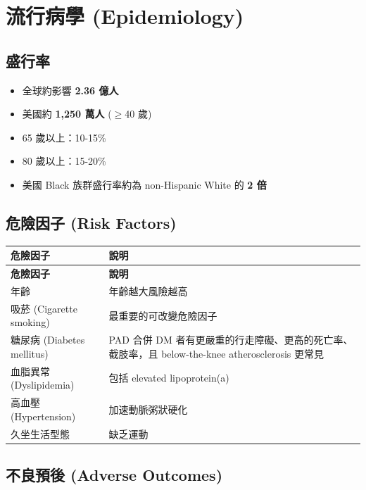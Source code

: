 \documentclass[12pt,a4paper]{article}
\begin{document}
\section{流行病學 (Epidemiology)}

\subsection{盛行率}

\begin{itemize}[leftmargin=2em]
    \item 全球約影響 \textbf{2.36 億人}
    \item 美國約 \textbf{1,250 萬人} ($\geq$40 歲)
    \item 65 歲以上：10-15\%
    \item 80 歲以上：15-20\%
    \item 美國 Black 族群盛行率約為 non-Hispanic White 的 \textbf{2 倍}
\end{itemize}

\subsection{危險因子 (Risk Factors)}

\begin{longtable}{p{4cm}p{10cm}}
\toprule
\textbf{危險因子} & \textbf{說明} \\
\midrule
\endfirsthead
\toprule
\textbf{危險因子} & \textbf{說明} \\
\midrule
\endhead
\bottomrule
\endfoot
年齡 & 年齡越大風險越高 \\
\midrule
吸菸 (Cigarette smoking) & 最重要的可改變危險因子 \\
\midrule
糖尿病 (Diabetes mellitus) & PAD 合併 DM 者有更嚴重的行走障礙、更高的死亡率、截肢率，且 below-the-knee atherosclerosis 更常見 \\
\midrule
血脂異常 (Dyslipidemia) & 包括 elevated lipoprotein(a) \\
\midrule
高血壓 (Hypertension) & 加速動脈粥狀硬化 \\
\midrule
久坐生活型態 & 缺乏運動 \\
\bottomrule
\end{longtable}

\subsection{不良預後 (Adverse Outcomes)}
\end{document}
